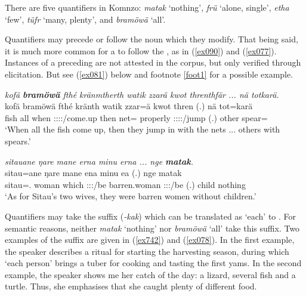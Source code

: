 There are five quantifiers in Komnzo: \emph{matak} `nothing', \emph{frü} `alone, single', \emph{etha} `few', \emph{tüfr} `many, plenty', and \emph{bramöwä} `all'.

Quantifiers may precede or follow the noun which they modify. That being said, it is much more common for a  to follow the , as in (\ref{ex090}) and (\ref{ex077}). Instances of a preceding  are not attested in the corpus, but only verified through elicitation. But see (\ref{ex081}) below and footnote \ref{foot1} for a possible example.

\begin{exe}
	\ex \emph{kofä \textbf{bramöwä} fthé kränmtherth watik zzarä kwot threnthfär ... nä totkarä.}\\
	\gll kofä bramöwä fthé kränth watik zzar=ä kwot thren (.) nä tot=karä\\
	fish all when \Stpl:\Sbj:\Irr:\Pfv:\Venit/come.up then net={\Assoc} properly \Stpl:\Sbj:\Irr:\Pfv:\Venit{}/jump (.) other spear={\Prop}\\
	\trans `When all the fish come up, then they jump in with the nets ... others with spears.' \\
	\label{ex090}
\end{exe}
\begin{exe}
	\ex \emph{sitauane ŋare mane erna minu erna ... nge \textbf{matak}.}\\
	\gll sitau=ane ŋare mane ena {minu} ea (.) nge matak\\
	sitau=\Poss.{\Sg} woman which \Stdu:\Sbj:\Pst:\Ipfv/be {barren.woman} \Stdu:\Sbj:\Pst:\Ipfv/be (.) child nothing\\
	\trans `As for Sitau's two wives, they were barren women without children.'\\ 
	\label{ex077}
\end{exe}

Quantifiers may take the  suffix (\emph{-kak}) which can be translated as `each' to . For semantic reasons, neither \emph{matak} `nothing' nor \emph{bramöwä} `all' take this suffix. Two examples of the  suffix are given in (\ref{ex742}) and (\ref{ex078}). In the first example, the speaker describes a ritual for starting the harvesting season, during which `each person' brings a tuber for cooking and tasting the first yams. In the second example, the speaker shows me her catch of the day: a lizard, several fish and a turtle. Thus, she emphasises that she caught plenty of different food.

